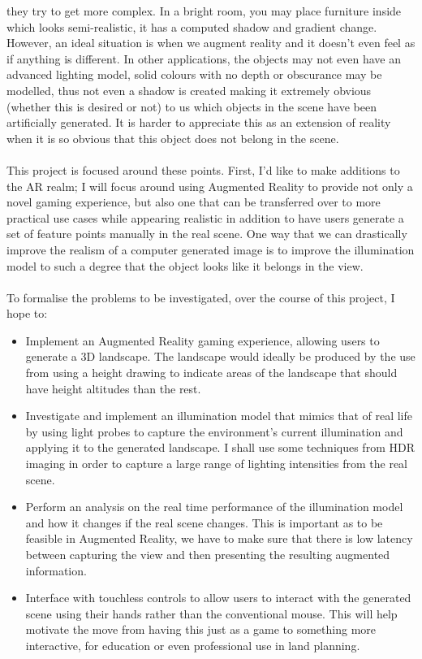 \documentclass[11pt]{report}
\begin{document}
they try to get more complex. In a bright room, you may place furniture inside
which looks semi-realistic, it has a computed shadow and gradient change. 
However, an ideal situation is when we augment reality and it doesn't even
feel as if anything is different. In other applications, the objects may not
even have an advanced lighting model, solid colours with no depth or 
obscurance may be modelled, thus not even a shadow is created making it 
extremely obvious (whether this is desired or not) to us which objects in
the scene have been artificially generated. It is harder to appreciate this
as an extension of reality when it is so obvious that this object does not
belong in the scene.
\\ \\
This project is focused around these points. First, I'd like to make additions
to the AR realm; I will focus around using Augmented Reality to 
provide not only a novel gaming experience, but also one that can be 
transferred over to more practical use cases while appearing realistic in
addition to have users generate a set of feature points manually in the real scene.
One way that we can drastically improve the realism of a computer generated
image is to improve the illumination model to such a degree that the object
looks like it belongs in the view. 
\\ \\
To formalise the problems to be investigated, over the course of this project,
I hope to:
\begin{itemize}
	\item Implement an Augmented Reality gaming experience, allowing users
		  to generate a 3D landscape. The landscape would ideally be produced
		  by the use from using a height drawing to indicate areas of the
		  landscape that should have height altitudes than the rest.
	\item Investigate and implement an illumination model that mimics that
		  of real life by using light probes to capture the environment's
		  current illumination and applying it to the generated landscape. I 
		  shall use some techniques from HDR imaging in order to capture a 
		  large range of lighting intensities from the real scene.
	\item Perform an analysis on the real time performance of the illumination
		  model and how it changes if the real scene changes. This is 
		  important as to be feasible in Augmented Reality, we have to make sure
		  that there is low latency between capturing the view and then 
		  presenting the resulting augmented information.
	\item Interface with touchless controls to allow users to interact with
		  the generated scene using their hands rather than the conventional
		  mouse. This will help motivate the move from having this just as a
		  game to something more interactive, for education or even professional
		  use in land planning.
\end{itemize}
\end{document}
